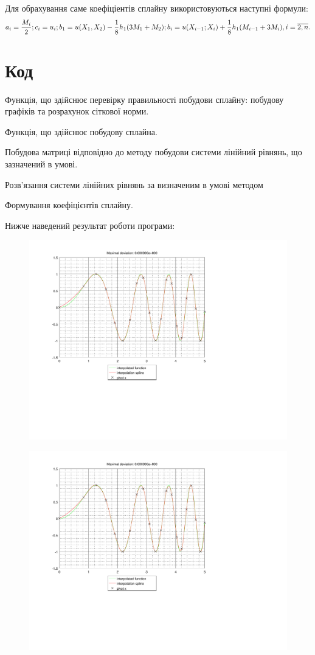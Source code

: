 \documentclass[titlepage]{article}
\newcommand\makelisting[1]{}
\begin{document}
Для обрахування саме коефіціентів сплайну використовуються наступні формули:
\begin{equation}
a_i = \frac{M_i}{2};\\
c_i = u_i;\\
b_1 = u(X_1, X_2) - \frac{1}{8}h_1(3M_1 + M_2);\\
b_i = u(X_{i-1};X_i) + \frac{1}{8}h_1(M_{i-1} + 3M_i), i=\overline{2,n}.
\end{equation}
\section{Код}

Функція, що здійснює перевірку правильності побудови сплайну: побудову графіків та розрахунок сіткової норми.
\makelisting{main.m}
Функція, що здійснює побудову сплайна.
\makelisting{CreateSpline.m}
Побудова матриці відповідно до методу побудови системи лінійний рівнянь, що зазначений в умові.
\makelisting{CreateMatrix.m}
Розв'язання системи лінійних рівнянь за визначеним в умові методом
\makelisting{Solve.m}
Формування коефіцієнтів сплайну.
\makelisting{FormSpline.m}
Нижче наведений результат роботи програми:
\begin{figure}[h]
\hspace{-3cm}\includegraphics[page=1]{../result.pdf}
\end{figure}
\begin{figure}[h]
\hspace{-3cm}\includegraphics[page=2]{../result.pdf}
\end{figure}
\end{document}
